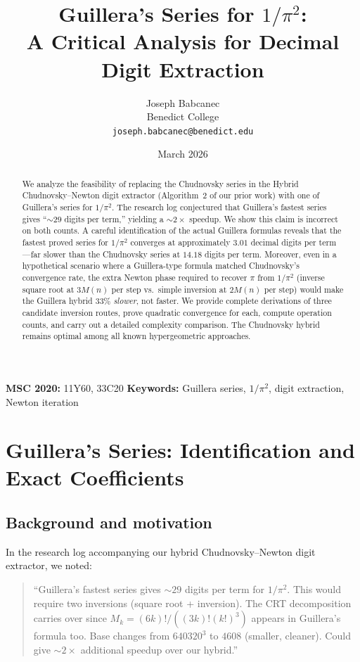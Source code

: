 \documentclass[11pt]{article}
\title{Guillera's Series for $1/\pi^2$: \\
A Critical Analysis for Decimal Digit Extraction}
\author{Joseph Babcanec\\Benedict College\\\texttt{joseph.babcanec@benedict.edu}}
\date{March 2026}
\begin{document}
\maketitle

\begin{abstract}
We analyze the feasibility of replacing the Chudnovsky series in the Hybrid Chudnovsky--Newton digit extractor (Algorithm~2 of our prior work) with one of Guillera's series for $1/\pi^2$. The research log conjectured that Guillera's fastest series gives ``${\sim}29$ digits per term,'' yielding a ${\sim}2\times$ speedup. We show this claim is incorrect on both counts. A careful identification of the actual Guillera formulas reveals that the fastest proved series for $1/\pi^2$ converges at approximately $3.01$ decimal digits per term---far slower than the Chudnovsky series at $14.18$ digits per term. Moreover, even in a hypothetical scenario where a Guillera-type formula matched Chudnovsky's convergence rate, the extra Newton phase required to recover $\pi$ from $1/\pi^2$ (inverse square root at $3M(n)$ per step vs.\ simple inversion at $2M(n)$ per step) would make the Guillera hybrid $33\%$ \emph{slower}, not faster. We provide complete derivations of three candidate inversion routes, prove quadratic convergence for each, compute operation counts, and carry out a detailed complexity comparison. The Chudnovsky hybrid remains optimal among all known hypergeometric approaches.
\end{abstract}

\noindent\textbf{MSC 2020:} 11Y60, 33C20 \hfill \textbf{Keywords:} Guillera series, $1/\pi^2$, digit extraction, Newton iteration

\section{Guillera's Series: Identification and Exact Coefficients}
\label{sec:identification}

\subsection{Background and motivation}

In the research log accompanying our hybrid Chudnovsky--Newton digit extractor, we noted:

\begin{quote}
``Guillera's fastest series gives ${\sim}29$ digits per term for $1/\pi^2$. This would require two inversions (square root + inversion). The CRT decomposition carries over since $M_k = (6k)!/((3k)!(k!)^3)$ appears in Guillera's formula too. Base changes from $640320^3$ to $4608$ (smaller, cleaner). Could give ${\sim}2\times$ additional speedup over our hybrid.''
\end{quote}
\end{document}
